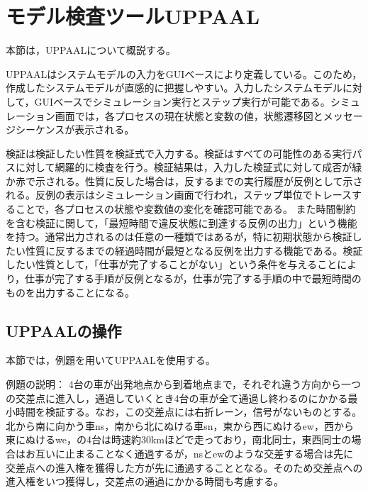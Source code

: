 \documentclass{tpu-sotu}
\begin{document}
	\section{モデル検査ツールUPPAAL}
	本節は，UPPAALについて概説する。
	
	UPPAALはシステムモデルの入力をGUIベースにより定義している。このため，作成したシステムモデルが直感的に把握しやすい。入力したシステムモデルに対して，GUIベースでシミュレーション実行とステップ実行が可能である。シミュレーション画面では，各プロセスの現在状態と変数の値，状態遷移図とメッセージシーケンスが表示される。
	
	検証は検証したい性質を検証式で入力する。検証はすべての可能性のある実行パスに対して網羅的に検査を行う。検証結果は，入力した検証式に対して成否が緑か赤で示される。性質に反した場合は，反するまでの実行履歴が反例として示される。反例の表示はシミュレーション画面で行われ，ステップ単位でトレースすることで，各プロセスの状態や変数値の変化を確認可能である。
	また時間制約を含む検証に関して，「最短時間で違反状態に到達する反例の出力」という機能を持つ。通常出力されるのは任意の一種類ではあるが，特に初期状態から検証したい性質に反するまでの経過時間が最短となる反例を出力する機能である。検証したい性質として，「仕事が完了することがない」という条件を与えることにより，仕事が完了する手順が反例となるが，仕事が完了する手順の中で最短時間のものを出力することになる。
	\subsection{UPPAALの操作}
	本節では，例題を用いてUPPAALを使用する。
	
	例題の説明：
	4台の車が出発地点から到着地点まで，それぞれ違う方向から一つの交差点に進入し，通過していくとき4台の車が全て通過し終わるのにかかる最小時間を検証する。なお，この交差点には右折レーン，信号がないものとする。北から南に向かう車ns，南から北にぬける車sn，東から西にぬけるew，西から東にぬけるwe，の4台は時速約30kmほどで走っており，南北同士，東西同士の場合はお互いに止まることなく通過するが，nsとewのような交差する場合は先に交差点への進入権を獲得した方が先に通過することとなる。そのため交差点への進入権をいつ獲得し，交差点の通過にかかる時間も考慮する。
	
\end{document}
